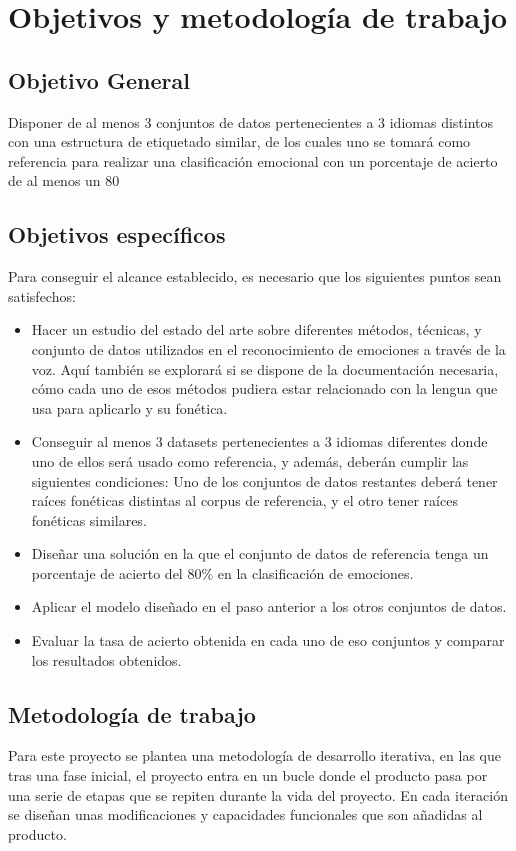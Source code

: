 \documentclass[11pt,a4paper,spanish]{book}
\begin{document}
	
	\chapter{Objetivos y metodología de trabajo}
		
	\section{Objetivo General}
	Disponer de al menos 3 conjuntos de datos pertenecientes a 3 idiomas distintos con una estructura de etiquetado similar, de los cuales uno se tomará como referencia para realizar una clasificación emocional con un porcentaje de acierto de al menos  un 80%
	
	\section{Objetivos específicos}
	Para conseguir el alcance establecido, es necesario que los siguientes puntos sean satisfechos:
	\begin{itemize}
		\item Hacer un estudio del estado del arte sobre diferentes métodos, técnicas, y conjunto de datos utilizados en el reconocimiento de emociones a través de la voz. Aquí también se explorará si se dispone de la documentación necesaria, cómo cada uno de esos métodos pudiera estar relacionado con la lengua que usa para aplicarlo y su fonética.
		
		\item  Conseguir al menos 3 datasets pertenecientes a 3 idiomas diferentes donde uno de ellos será usado como referencia, y además, deberán cumplir las siguientes condiciones: Uno de los conjuntos de datos restantes deberá tener raíces fonéticas distintas al corpus de referencia, y el otro tener raíces fonéticas similares.
		
		\item Diseñar una solución en la que el conjunto de datos de referencia tenga un porcentaje de acierto del 80\% en la clasificación de emociones.
		
		\item Aplicar el modelo diseñado en el paso anterior a los otros conjuntos de datos.
		
		\item Evaluar la tasa de acierto obtenida en cada uno de eso conjuntos y comparar los resultados obtenidos.
		
	\end{itemize}
	\section{Metodología de trabajo}
	Para este proyecto se plantea una metodología de desarrollo iterativa, en las que tras una fase inicial, el proyecto entra en un bucle donde el producto pasa por una serie de etapas que se repiten durante la vida del proyecto. En cada iteración se diseñan unas modificaciones y capacidades funcionales que son añadidas al producto.
	
\end{document}

